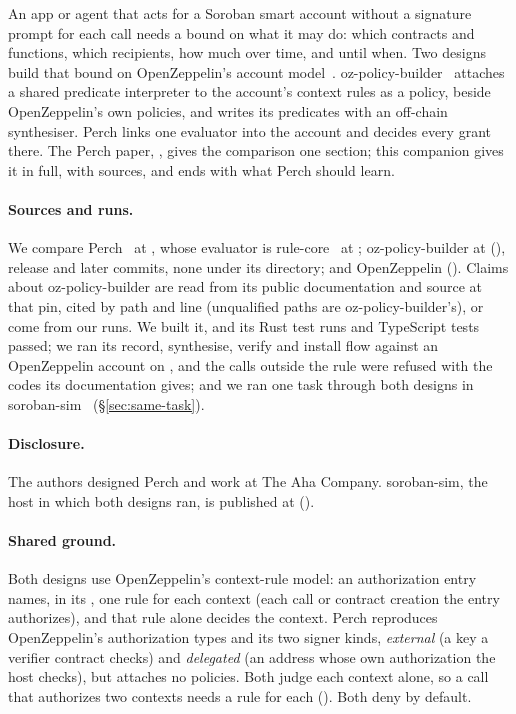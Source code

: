 An app or agent that acts for a Soroban smart account without a signature prompt
for each call needs a bound on what it may do: which contracts and functions,
which recipients, how much over time, and until when. Two designs build that
bound on OpenZeppelin's account model~\cite{oz-stellar-accounts}.
oz-policy-builder~\cite{oz-policy-builder} attaches a shared predicate
interpreter to the account's context rules as a policy, beside OpenZeppelin's own
policies, and writes its predicates with an off-chain synthesiser. Perch links
one evaluator into the account and decides every grant there. The Perch paper,
, gives the comparison one section; this companion gives it in
full, with sources, and ends with what Perch should learn.

\paragraph{Sources and runs.} We compare Perch~\cite{perch-src} at , whose
evaluator is rule-core~\cite{rule-core} at ;
oz-policy-builder at  (), release
 and  later commits, none under
its  directory; and OpenZeppelin 
 (). Claims about oz-policy-builder are
read from its public documentation and source at that pin, cited by path and
line (unqualified paths are oz-policy-builder's), or come from our runs. We built
it, and its  Rust test runs and 
TypeScript tests passed; we ran its record, synthesise, verify and install flow
against an OpenZeppelin  account on
, and the calls outside the rule were refused with the
codes its documentation gives; and we ran one task through both designs in
soroban-sim~\cite{soroban-sim} (\S\ref{sec:same-task}).

\paragraph{Disclosure.} The authors designed Perch and work at The Aha Company.
soroban-sim, the host in which both designs ran, is published at
 ().

\paragraph{Shared ground.} Both designs use OpenZeppelin's context-rule model: an
authorization entry names, in its , one rule for each
context (each call or contract creation the entry authorizes), and that rule
alone decides the context. Perch reproduces OpenZeppelin's authorization types
and its two signer kinds, \emph{external} (a key a verifier contract checks) and
\emph{delegated} (an address whose own authorization the host checks), but
attaches no policies. Both judge each context alone, so a call that authorizes
two contexts needs a rule for each (). Both
deny by default.

